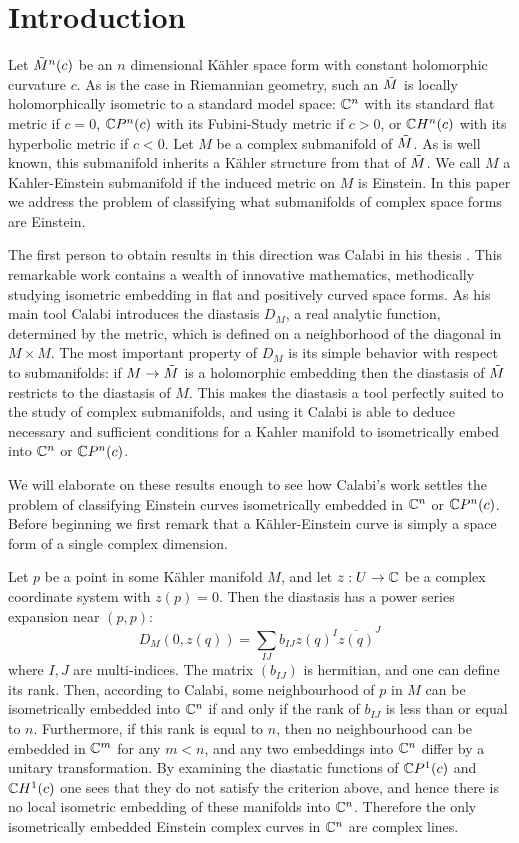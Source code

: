 \section{Introduction}

Let $\tilde{M}^n(c)$ be an $n$ dimensional K\"{a}hler space form with constant holomorphic curvature $c$.  As is the case in Riemannian geometry, such an $\tilde{M}$ is locally holomorphically isometric to a standard model space: $\mathbb{C}^n$ with its standard flat metric if $c=0$, $\mathbb{C}P^n(c)$ with its Fubini-Study metric if $c>0$, or $\mathbb{C}H^n(c)$ with its hyperbolic metric if $c<0$.  Let $M$ be a complex submanifold of $\tilde{M}$.  As is well known, this submanifold inherits a K\"{a}hler structure from that of $\tilde{M}$.  We call $M$ a Kahler-Einstein submanifold if the induced metric on $M$ is Einstein.  In this paper we address the problem of classifying what submanifolds of complex space forms are Einstein.

The first person to obtain results in this direction was Calabi in his thesis \cite{C1}.  This remarkable work contains a wealth of innovative mathematics, methodically studying isometric embedding in flat and positively curved space forms.  As his main tool Calabi introduces the diastasis $D_M$, a real analytic function, determined by the metric, which is defined on a neighborhood of the diagonal in $M \times M$.  The most important property of $D_M$ is its simple behavior with respect to submanifolds:  if $M \rightarrow \tilde{M}$ is a holomorphic embedding then the diastasis of $\tilde{M}$ restricts to the diastasis of $M$.  This makes the diastasis a tool perfectly suited to the study of complex submanifolds, and using it Calabi is able to deduce necessary and sufficient conditions for a Kahler manifold to isometrically embed into $\mathbb{C}^n$ or $\mathbb{C}P^n(c)$.  

We will elaborate on these results enough to see how Calabi's work settles the problem of classifying Einstein curves isometrically embedded in $\mathbb{C}^n$ or $\mathbb{C}P^n(c)$.  Before beginning we first remark that a K\"{a}hler-Einstein curve is simply a space form of a single complex dimension.  

Let $p$ be a point in some K\"{a}hler manifold $M$, and let $z:U \rightarrow \mathbb{C}$ be a complex coordinate system with $z(p) = 0$.  Then the diastasis has a power series expansion near $(p,p)$:
%
$$ D_M(0, z(q)) = \sum_{IJ} b_{IJ} z(q)^I \overline{z(q)}^J $$
%
where $I,J$ are multi-indices.  The matrix $(b_{IJ})$ is hermitian, and one can define its rank.  Then, according to Calabi, some neighbourhood of $p$ in $M$ can be isometrically embedded into $\mathbb{C}^n$ if and only if the rank of $b_{IJ}$ is less than or equal to $n$.  Furthermore, if this rank is equal to $n$, then no neighbourhood can be embedded in $\mathbb{C}^{m}$ for any $m < n$, and any two embeddings into $\mathbb{C}^n$ differ by a unitary transformation.  By examining the diastatic functions of $\mathbb{C}P^{1}(c)$ and $\mathbb{C}H^{1}(c)$ one sees that they do not satisfy the criterion above, and hence there is no local isometric embedding of these manifolds into $\mathbb{C}^n$.  Therefore the only isometrically embedded Einstein complex curves in $\mathbb{C}^n$ are complex lines.

